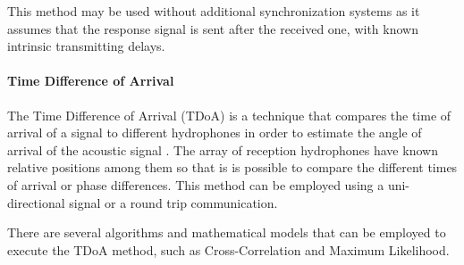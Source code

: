 This method may be used without additional synchronization systems as it assumes that the response signal is sent after the received one, with known intrinsic transmitting delays.

\paragraph{Time Difference of Arrival}

The Time Difference of Arrival (TDoA) is a technique that compares the time of arrival of a signal to different hydrophones in order to estimate the angle of arrival of the acoustic signal \cite{und-localiz-survey}. The array of reception hydrophones have known relative positions among them so that is is possible to compare the different times of arrival or phase differences. This method can be employed using a uni-directional signal or a round trip communication.

There are several algorithms and mathematical models that can be employed to execute the TDoA method, such as Cross-Correlation and Maximum Likelihood.


